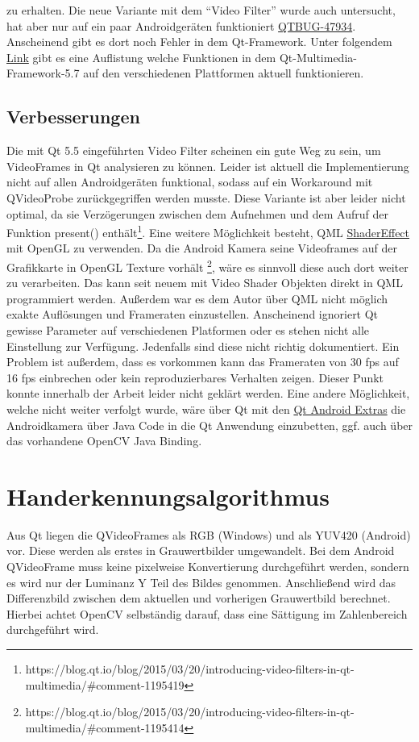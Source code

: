 zu erhalten. Die neue Variante mit dem "`Video Filter"' wurde auch untersucht, hat aber nur auf ein paar Androidgeräten funktioniert \href{https://bugreports.qt.io/browse/QTBUG-47934/}{QTBUG-47934}. Anscheinend gibt es dort noch Fehler in dem Qt-Framework. Unter folgendem \href{https://wiki.qt.io/Qt_5.7_Multimedia_Backends}{Link} gibt es eine Auflistung welche Funktionen in dem Qt-Multimedia-Framework-5.7 auf den verschiedenen Plattformen aktuell funktionieren.

\subsection{Verbesserungen}
Die mit Qt 5.5 eingeführten Video Filter scheinen ein gute Weg zu sein, um VideoFrames in Qt analysieren zu können. Leider ist aktuell die Implementierung nicht auf allen Androidgeräten funktional, sodass auf ein Workaround mit QVideoProbe zurückgegriffen werden musste. Diese Variante ist aber leider nicht optimal, da sie Verzögerungen zwischen dem Aufnehmen und dem Aufruf der Funktion present() enthält\footnote{https://blog.qt.io/blog/2015/03/20/introducing-video-filters-in-qt-multimedia/\#comment-1195419}. Eine weitere Möglichkeit besteht, QML \href{http://doc.qt.io/qt-5/qml-qtquick-shadereffect.html}{ShaderEffect} mit OpenGL zu verwenden. Da die Android Kamera seine Videoframes auf der Grafikkarte in OpenGL Texture vorhält \footnote{https://blog.qt.io/blog/2015/03/20/introducing-video-filters-in-qt-multimedia/\#comment-1195414}, wäre es sinnvoll diese auch dort weiter zu verarbeiten. Das kann seit neuem mit Video Shader Objekten direkt in QML programmiert werden. Außerdem war es dem Autor über QML nicht möglich exakte Auflösungen und Frameraten einzustellen. Anscheinend ignoriert Qt gewisse Parameter auf verschiedenen Platformen oder es stehen nicht alle Einstellung zur Verfügung. Jedenfalls sind diese nicht richtig dokumentiert. Ein Problem ist außerdem, dass es vorkommen kann das Frameraten von 30 fps auf 16 fps einbrechen oder kein reproduzierbares Verhalten zeigen. Dieser Punkt konnte innerhalb der Arbeit leider nicht geklärt werden. Eine andere Möglichkeit, welche nicht weiter verfolgt wurde, wäre über Qt mit den \href{http://doc.qt.io/qt-5/qtandroidextras-module.html}{Qt Android Extras} die Androidkamera über Java Code in die Qt Anwendung einzubetten, ggf. auch über das vorhandene OpenCV Java Binding. 

\section{Handerkennungsalgorithmus}
Aus Qt liegen die QVideoFrames als RGB (Windows) und als YUV420 (Android) vor. Diese werden als erstes in Grauwertbilder umgewandelt. Bei dem Android QVideoFrame muss keine pixelweise Konvertierung durchgeführt werden, sondern es wird nur der Luminanz Y Teil des Bildes genommen. Anschließend wird das Differenzbild zwischen dem aktuellen und vorherigen Grauwertbild berechnet. Hierbei achtet OpenCV selbständig darauf, dass eine Sättigung im Zahlenbereich durchgeführt wird.

